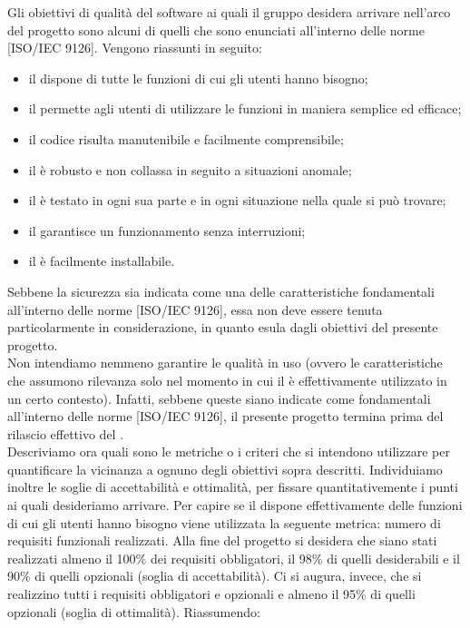 				Gli obiettivi di qualità del software ai quali il gruppo \groupname{} desidera arrivare nell'arco del progetto sono alcuni di quelli che sono enunciati all'interno delle norme [ISO/IEC 9126]. Vengono riassunti in seguito:
				\begin{itemize}
					\item il  dispone di tutte le funzioni di cui gli utenti hanno bisogno;
					\item il  permette agli utenti di utilizzare le funzioni in maniera semplice ed efficace;
					\item il codice risulta manutenibile e facilmente comprensibile;
					\item il  è robusto e non collassa in seguito a situazioni anomale;
					\item il  è testato in ogni sua parte e in ogni situazione nella quale si può trovare;
					\item il  garantisce un funzionamento senza interruzioni;
					\item il  è facilmente installabile.
				\end{itemize}
				Sebbene la sicurezza sia indicata come una delle caratteristiche fondamentali all'interno delle norme [ISO/IEC 9126], essa non deve essere tenuta particolarmente in considerazione, in quanto esula dagli obiettivi del presente progetto.\\
				Non intendiamo nemmeno garantire le qualità in uso (ovvero le caratteristiche che assumono rilevanza solo nel momento in cui il  è effettivamente utilizzato in un certo contesto). Infatti, sebbene queste siano indicate come fondamentali all'interno delle norme [ISO/IEC 9126], il presente progetto termina prima del rilascio effettivo del .\\
				Descriviamo ora quali sono le metriche o i criteri che si intendono utilizzare per quantificare la vicinanza a ognuno degli obiettivi sopra descritti. Individuiamo inoltre le soglie di accettabilità e ottimalità, per fissare quantitativemente i punti ai quali desideriamo arrivare.
					Per capire se il  dispone effettivamente delle funzioni di cui gli utenti hanno bisogno viene utilizzata la seguente metrica: numero di requisiti funzionali realizzati. Alla fine del progetto si desidera che siano stati realizzati almeno il 100\% dei requisiti obbligatori, il 98\% di quelli desiderabili e il 90\% di quelli opzionali (soglia di accettabilità). Ci si augura, invece, che si realizzino tutti i requisiti obbligatori e opzionali e almeno il 95\% di quelli opzionali (soglia di ottimalità). Riassumendo:
